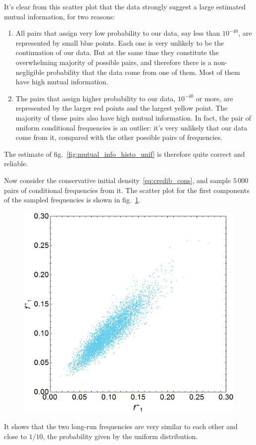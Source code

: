 \documentclass[\ifafour a4paper,12pt,\else a5paper,10pt,\fi%
onecolumn,oneside,article,%
british%
]{memoir}
\theoremstyle{remark}
\theoremstyle{innote}
\renewcommand*{\|}{\nonscript\,\vert\nonscript\;\mathopen{}}
\newcommand*{\fig}{fig.}%
\begin{document}
It's clear from this scatter plot that the data strongly suggest a large
estimated mutual information, for two reasons:
\begin{enumerate}[label=\arabic*.]
\item All pairs that assign very low probability to our data, say less than
  $10^{-40}$, are represented by small blue points. Each one is very
  unlikely to be the continuation of our data. But at the same time they
  constitute the overwhelming majority of possible pairs, and therefore
  there is a non-negligible probability that the data come from one of
  them. Most of them have high mutual information.
\item The pairs that assign higher probability to our data, $10^{-40}$ or
  more, are represented by the larger red points and the largest yellow
  point. The majority of these pairs also have high mutual information. In
  fact, the pair of uniform conditional frequencies is an outlier: it's
  very unlikely that our data come from it, compared with the other
  possible pairs of frequencies.
\end{enumerate}
The estimate of \fig~\ref{fig:mutual_info_histo_unif} is therefore quite
correct and reliable.

\medskip

Now consider the conservative initial density~\eqref{eq:credib_cons}, and
sample $5\,000$ pairs of conditional frequencies from it. The scatter plot
for the first components of the sampled frequencies is shown in
\fig~\ref{fig:f1_cons}.
\begin{figure}[h!]
\centering\includegraphics[width=0.5\linewidth]{B_sample_f1.png}\\
\caption{}\label{fig:f1_cons}
\end{figure}%
It shows that the two long-run frequencies are very similar to each other and close
to $1/10$, the probability given by the uniform distribution.
\end{document}
